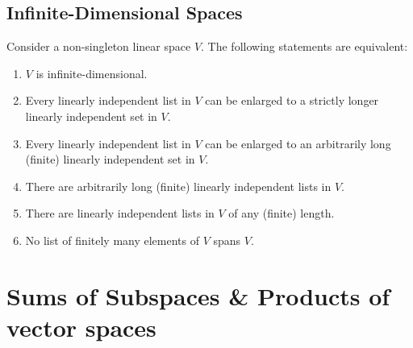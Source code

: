 \documentclass{article}
\theoremstyle{definition}
\begin{document}
\subsection{Infinite-Dimensional Spaces}
Consider a non-singleton linear space $V$. The following statements are equivalent:
\begin{enumerate}
	\item $V$ is infinite-dimensional.
	\item Every linearly independent list in $V$ can be enlarged to a strictly longer linearly independent set in $V$.
	\item Every linearly independent list in $V$ can be enlarged to an arbitrarily long (finite) linearly independent set in $V$.
	\item There are arbitrarily long (finite) linearly independent lists in $V$.
	\item There are linearly independent lists in $V$ of any (finite) length.
	\item No list of finitely many elements of $V$ spans $V$.
\end{enumerate}
\newpage
\section{Sums of Subspaces \& Products of vector spaces}
\end{document}
